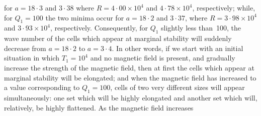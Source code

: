 
for $a = 18{\cdot}3$ and $3{\cdot}38$ where
$R = 4{\cdot}00\times10^{4}$ and $4{\cdot}78\times10^{4}$, respectively;
while, for $Q_1 = 100$ the two minima occur for $a = 18{\cdot}2$ and
$3{\cdot}37$, where $R = 3{\cdot}98\times10^{4}$ and
$3{\cdot}93\times10^{4}$, respectively.  Consequently, for $Q_1$ slightly
less than~100, the wave number of the cells which appear at marginal
stability will suddenly decrease from $a = 18{\cdot}2$ to $a = 3{\cdot}4$.
In other words, if we start with an initial situation in which
$T_1 = 10^{4}$ and no magnetic field is present, and gradually increase the
strength of the magnetic field, then at first the cells which appear at
marginal stability will be elongated; and when the magnetic field has
increased to a value corresponding to $Q_1 = 100$, cells of two very
different sizes will appear simultaneously: one set which will be highly
elongated and another set which will, relatively, be highly flattened.  As the
magnetic field increases
